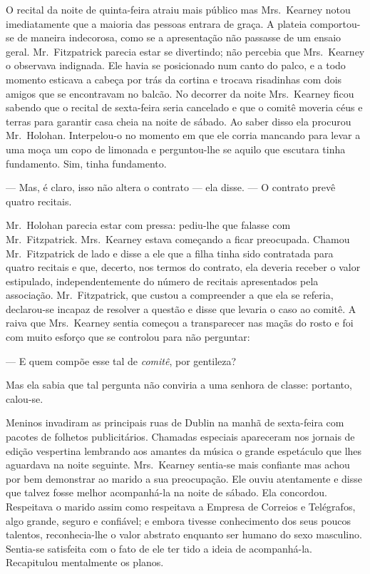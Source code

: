 O recital da noite de quinta-feira atraiu mais público mas Mrs.~Kearney notou
imediatamente que a maioria das pessoas entrara de graça.  A plateia
comportou-se de maneira indecorosa, como se a apresentação não passasse de um
ensaio geral.  Mr.~Fitzpatrick parecia estar se divertindo; não percebia que
Mrs.~Kearney o observava indignada.  Ele havia se posicionado num canto do
palco, e a todo momento esticava a cabeça por trás da cortina e trocava
risadinhas com dois amigos que se encontravam no balcão.  No decorrer da noite
Mrs.~Kearney ficou sabendo que o recital de sexta-feira seria cancelado e que o
comitê moveria céus e terras para garantir casa cheia na noite de sábado.  Ao
saber disso ela procurou Mr.~Holohan.  Interpelou-o no momento em que ele
corria mancando para levar a uma moça um copo de limonada e perguntou-lhe se
aquilo que escutara tinha fundamento.  Sim, tinha fundamento.

--- Mas, é claro, isso não altera o contrato --- ela disse.  --- O contrato
prevê quatro recitais.

Mr.~Holohan parecia estar com pressa: pediu-lhe que falasse com Mr.~Fitzpatrick.  
Mrs.~Kearney estava começando a ficar preocupada.  Chamou Mr.~Fitzpatrick de lado 
e disse a ele que a filha tinha sido contratada para quatro
recitais e que, decerto, nos termos do contrato, ela deveria receber o valor
estipulado, independentemente do número de recitais apresentados pela
associação.  Mr.~Fitzpatrick, que custou a compreender a que ela se referia,
declarou-se incapaz de resolver a questão e disse que levaria o caso ao comitê.
A raiva que Mrs.~Kearney sentia começou a transparecer nas maçãs do rosto e foi
com muito esforço que se controlou para não perguntar:

--- E quem compõe esse tal de \textit{comitê}, por gentileza?

Mas ela sabia que tal pergunta não conviria a uma senhora de classe: portanto,
calou-se.

Meninos invadiram as principais ruas de Dublin na manhã de sexta-feira com
pacotes de folhetos publicitários.  Chamadas especiais apareceram nos jornais
de edição vespertina lembrando aos amantes da música o grande espetáculo que
lhes aguardava na noite seguinte.  Mrs.~Kearney sentia-se mais confiante mas
achou por bem demonstrar ao marido a sua preocupação.  Ele ouviu atentamente e
disse que talvez fosse melhor acompanhá-la na noite de sábado.  Ela concordou.
Respeitava o marido assim como respeitava a Empresa de Correios e Telégrafos,
algo grande, seguro e confiável; e embora tivesse conhecimento dos seus poucos
talentos, reconhecia-lhe o valor abstrato enquanto ser humano do sexo
masculino.  Sentia-se satisfeita com o fato de ele ter tido a ideia de
acompanhá-la.  Recapitulou mentalmente os planos.

